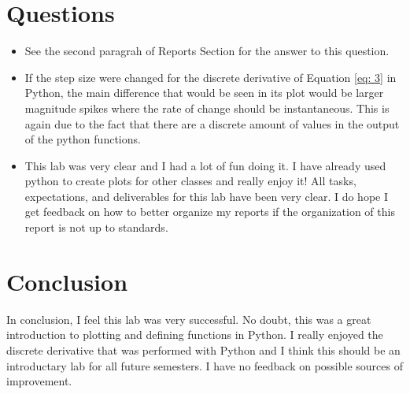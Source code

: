 \documentclass[12pt]{report}
\begin{document}
\section{Questions}
\begin{itemize}
  \item See the second paragrah of Reports Section for the answer to this question.
  \item If the step size were changed for the discrete derivative of Equation \eqref{eq: 3} in Python, the main difference that would be seen in its plot would be larger magnitude
  spikes where the rate of change should be instantaneous. This is again due to the fact that there are a discrete amount of values in the output of the python functions.
  \item This lab was very clear and I had a lot of fun doing it. I have already used python to create plots for other classes and really enjoy it! All tasks, expectations, and 
  deliverables for this lab have been very clear. I do hope I get feedback on how to better organize my reports if the organization of this report is not up to standards.
\end{itemize}
\section{Conclusion}
In conclusion, I feel this lab was very successful. No doubt, this was a great introduction to plotting and defining functions in Python. I really enjoyed the discrete derivative 
that was performed with Python and I think this should be an introductary lab for all future semesters. I have no feedback on possible sources of improvement.
\newpage
\begin{thebibliography}{111}
\thispagestyle{customplain}

\end{thebibliography}
\end{document}
